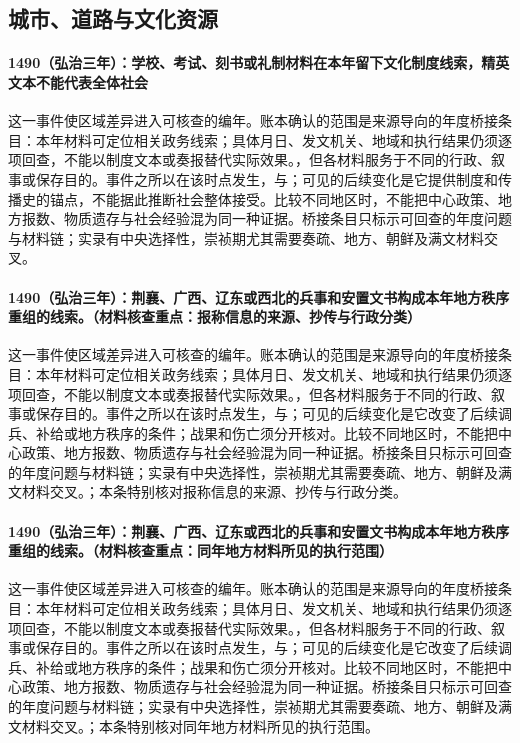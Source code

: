 \subsection{城市、道路与文化资源}

\paragraph{1490（弘治三年）：学校、考试、刻书或礼制材料在本年留下文化制度线索，精英文本不能代表全体社会} 这一事件使区域差异进入可核查的编年。账本确认的范围是来源导向的年度桥接条目：本年材料可定位相关政务线索；具体月日、发文机关、地域和执行结果仍须逐项回查，不能以制度文本或奏报替代实际效果。，但各材料服务于不同的行政、叙事或保存目的。事件之所以在该时点发生，与；可见的后续变化是它提供制度和传播史的锚点，不能据此推断社会整体接受。比较不同地区时，不能把中心政策、地方报数、物质遗存与社会经验混为同一种证据。桥接条目只标示可回查的年度问题与材料链；实录有中央选择性，崇祯期尤其需要奏疏、地方、朝鲜及满文材料交叉。

\paragraph{1490（弘治三年）：荆襄、广西、辽东或西北的兵事和安置文书构成本年地方秩序重组的线索。（材料核查重点：报称信息的来源、抄传与行政分类）} 这一事件使区域差异进入可核查的编年。账本确认的范围是来源导向的年度桥接条目：本年材料可定位相关政务线索；具体月日、发文机关、地域和执行结果仍须逐项回查，不能以制度文本或奏报替代实际效果。，但各材料服务于不同的行政、叙事或保存目的。事件之所以在该时点发生，与；可见的后续变化是它改变了后续调兵、补给或地方秩序的条件；战果和伤亡须分开核对。比较不同地区时，不能把中心政策、地方报数、物质遗存与社会经验混为同一种证据。桥接条目只标示可回查的年度问题与材料链；实录有中央选择性，崇祯期尤其需要奏疏、地方、朝鲜及满文材料交叉。；本条特别核对报称信息的来源、抄传与行政分类。

\paragraph{1490（弘治三年）：荆襄、广西、辽东或西北的兵事和安置文书构成本年地方秩序重组的线索。（材料核查重点：同年地方材料所见的执行范围）} 这一事件使区域差异进入可核查的编年。账本确认的范围是来源导向的年度桥接条目：本年材料可定位相关政务线索；具体月日、发文机关、地域和执行结果仍须逐项回查，不能以制度文本或奏报替代实际效果。，但各材料服务于不同的行政、叙事或保存目的。事件之所以在该时点发生，与；可见的后续变化是它改变了后续调兵、补给或地方秩序的条件；战果和伤亡须分开核对。比较不同地区时，不能把中心政策、地方报数、物质遗存与社会经验混为同一种证据。桥接条目只标示可回查的年度问题与材料链；实录有中央选择性，崇祯期尤其需要奏疏、地方、朝鲜及满文材料交叉。；本条特别核对同年地方材料所见的执行范围。

